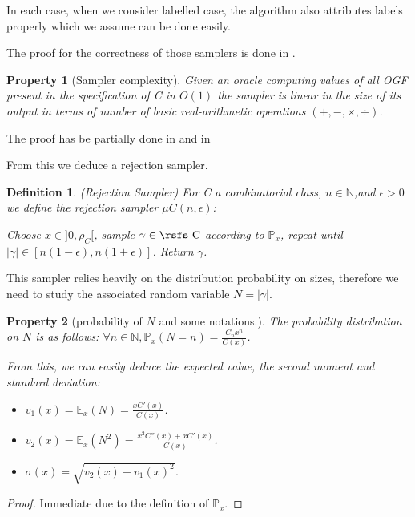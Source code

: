 \documentclass{article}
\newtheorem{proof}{Proof}
\newtheorem{property}{Property}
\newtheorem{definition}{Definition}
\begin{document}
In each case, when we consider labelled case, the algorithm also attributes labels properly which we assume can be done easily.

The proof for the correctness of those samplers is done in \cite{BS}. 

\begin{property}[Sampler complexity]
Given an oracle computing values of all OGF present in the specification of {\rsfs C} in $O(1)$ the sampler is linear in the size of its output in terms of number of basic real-arithmetic operations $(+,-,\times,\div)$.
\end{property}

The proof has be partially done in \cite{BS} and in \cite{MEMO}

From this we deduce a rejection sampler.

\begin{definition}(Rejection Sampler)
For {\rsfs C} a combinatorial class, $n \in \mathbb{N}$,and $\epsilon > 0$ we define the rejection sampler $\mu C(n,\epsilon)$:

 Choose $x \in ]0,\rho_C[$, sample $\gamma \in \text{\rsfs C}$ according to $\mathbb{P}_x$, repeat until $|\gamma| \in [n(1-\epsilon),n(1+\epsilon)]$. Return $\gamma$.
\end{definition}

This sampler relies heavily on the distribution probability on sizes, therefore we need to study the associated random variable $N = |\gamma|$.

\begin{property}[probability of $N$ and some notations.]
The probability distribution on $N$ is as follows: $\forall n\in \mathbb{N}, \mathbb{P}_x(N = n) = \frac{C_nx^n}{C(x)}$.

From this, we can easily deduce the expected value, the second moment and standard deviation:
\begin{itemize}
\item $v_1(x) = \mathbb{E}_x(N) = \frac{xC'(x)}{C(x)}$.

\item $v_2(x) = \mathbb{E}_x(N^2) = \frac{x^2C''(x)+xC'(x)}{C(x)}$.

\item $\sigma(x) = \sqrt{v_2(x)-{v_1(x)}^2}$.
\end{itemize}
\end{property}

\begin{proof}
Immediate due to the definition of $\mathbb{P}_x$.
\end{proof}
\end{document}
